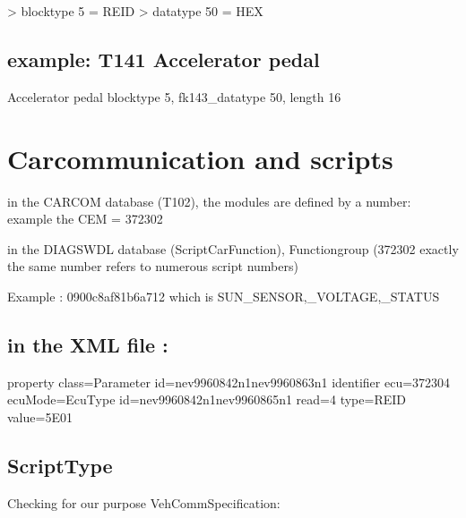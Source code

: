 \documentclass[letterpaper,10pt,english]{sphinxmanual}
\begin{document}
\sphinxAtStartPar
\sphinxhyphen{}\textgreater{} blocktype 5 = REID
\sphinxhyphen{}\textgreater{} datatype 50 = HEX


\subsection{example: T141 Accelerator pedal}
\label{\detokenize{vidadatabase/block:example-t141-accelerator-pedal}}
 Accelerator pedal blocktype 5, fk143\_datatype 50, length 16

\noindent{}


\section{Carcommunication and scripts}
\label{\detokenize{vidadatabase/link-carcom-diagswdl:carcommunication-and-scripts}}\label{\detokenize{vidadatabase/link-carcom-diagswdl::doc}}
\sphinxAtStartPar
in the CARCOM database (T102), the modules are defined by a number:
example the CEM = 372302

\sphinxAtStartPar
{}

\sphinxAtStartPar
in the DIAGSWDL database (ScriptCarFunction), Functiongroup (372302 exactly the same number refers to numerous script numbers)

\sphinxAtStartPar
Example : 0900c8af81b6a712 which is SUN\_SENSOR,\_VOLTAGE,\_STATUS


\subsection{in the XML file :}
\label{\detokenize{vidadatabase/link-carcom-diagswdl:in-the-xml-file}}
\begin{sphinxVerbatim}[commandchars=\\\{\}]
property class=\PYGZdq{}Parameter\PYGZdq{} id=\PYGZdq{}nev9960842n1\PYGZhy{}nev9960863n1\PYGZdq{}
identifier ecu=\PYGZdq{}372304\PYGZdq{} ecuMode=\PYGZdq{}EcuType\PYGZdq{} id=\PYGZdq{}nev9960842n1\PYGZhy{}nev9960865n1\PYGZdq{} read=\PYGZdq{}4\PYGZdq{} type=\PYGZdq{}REID\PYGZdq{} value=\PYGZdq{}5E01\PYGZdq{}
\end{sphinxVerbatim}

\noindent{}


\subsection{ScriptType}
\label{\detokenize{vidadatabase/link-carcom-diagswdl:scripttype}}
\sphinxAtStartPar
Checking for our purpose VehCommSpecification:
\end{document}
